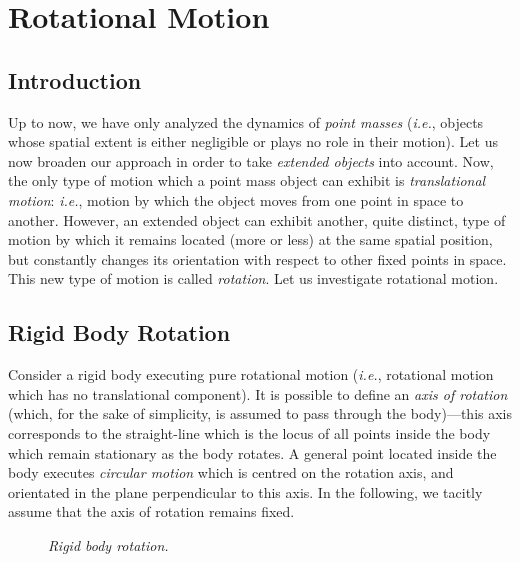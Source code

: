 \section{Rotational Motion}
\subsection{Introduction}
Up to now, we have  only analyzed the dynamics
of {\em point masses} ({\em i.e.}, objects whose spatial extent is either
negligible or plays no role in their motion). Let us now
broaden our approach   in order to take {\em extended objects} into account.
Now, the only type of motion which a point mass object can exhibit is {\em translational
motion}: {\em i.e.}, motion by which the object moves from one point in space
to another. However, an extended object can exhibit another, quite distinct, type of
motion by which it remains located (more or less) at the same spatial position,
but constantly changes its orientation with respect to other fixed points in space.
This new type of motion is called {\em rotation}. Let us investigate rotational motion.

\subsection{Rigid Body Rotation}
Consider a rigid body executing pure rotational motion ({\em i.e.}, rotational motion which
has no translational component). It is possible to define an {\em axis of rotation}
(which, for the sake of simplicity, is assumed to pass through the body)---this
axis corresponds to   the straight-line
which is the locus of all points inside the body which remain stationary as the body rotates. A general point
located inside the body executes {\em circular motion} which is centred on the rotation axis, and orientated
in the plane perpendicular to this axis. In the following, we tacitly assume that the axis
of rotation remains fixed.

\begin{figure}
\epsfysize=3in
\centerline{}
\caption{\em Rigid body rotation.}\label{f68}  
\end{figure}

